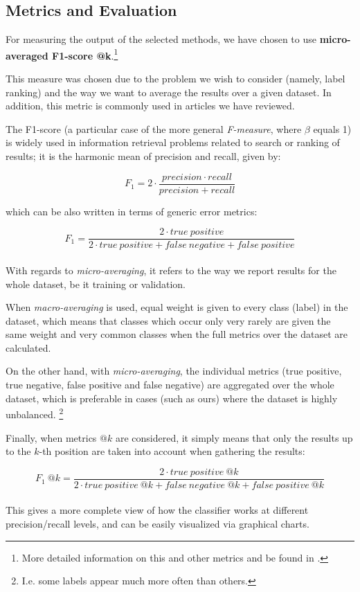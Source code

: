 \subsection{Metrics and Evaluation}

For measuring the output of the selected methods, we have chosen to use \textbf{micro-averaged F1-score @k}.\footnote{More detailed information on this and other metrics and be found in \cite{sokolova_and_napalme_2009}.}

This measure was chosen due to the problem we wish to consider (namely, label ranking) and the way we want to average the results over a given dataset. In addition, this metric is commonly used in articles we have reviewed.

The F1-score (a particular case of the more general \textit{F-measure}, where $\beta$ equals 1) is widely used in information retrieval problems related to search or ranking of results; it is the harmonic mean of precision and recall, given by:

\begin{equation}
F_1 = 2 \cdot \frac{precision \cdot recall}{precision + recall} 
\end{equation}

which can be also written in terms of generic error metrics:

\begin{equation}
F_1 = \frac{2 \cdot true \ positive}{2 \cdot true \ positive + false \ negative + false \ positive} 
\end{equation}\\

With regards to \textit{micro-averaging}, it refers to the way we report results for the whole dataset, be it training or validation.

When \textit{macro-averaging} is used, equal weight is given to every class (label) in the dataset, which means that classes which occur only very rarely are given the same weight and very common classes when the full metrics over the dataset are calculated.

On the other hand, with \textit{micro-averaging}, the individual metrics (true positive, true negative, false positive and false negative) are aggregated over the whole dataset, which is preferable in cases (such as ours) where the dataset is highly unbalanced. \footnote{I.e. some labels appear much more often than others.}  

Finally, when metrics $@k$ are considered, it simply means that only the results up to the $k$-th position are taken into account when gathering the results:

\begin{equation}
F_1\ @k = \frac{2 \cdot true \ positive\ @k}{2 \cdot true \ positive\ @k + false \ negative\ @k + false \ positive\ @k} 
\end{equation}\\

This gives a more complete view of how the classifier works at different precision/recall levels, and can be easily visualized via graphical charts.